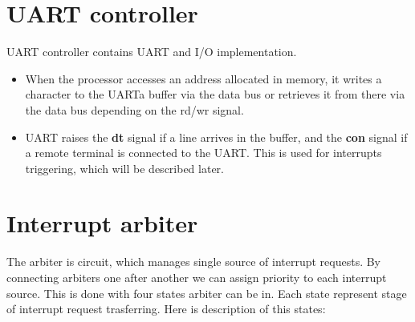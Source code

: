 \section*{UART controller}

UART controller contains UART and I/O implementation.

\begin{itemize}
	\item When the processor accesses an address allocated in memory, it writes a character to the UARTa buffer via the data bus or retrieves it from there via the data bus depending on the rd/wr signal.
	\item UART raises the \textbf{dt} signal if a line arrives in the buffer, and the \textbf{con} signal if a remote terminal is connected to the UART. This is used for interrupts triggering, which will be described later.
\end{itemize}

\section*{Interrupt arbiter}

The arbiter is circuit, which manages single source of interrupt requests. By connecting arbiters one after another we can assign priority to each interrupt source. This is done with four states arbiter can be in. Each state represent stage of interrupt request trasferring. Here is description of this states:


